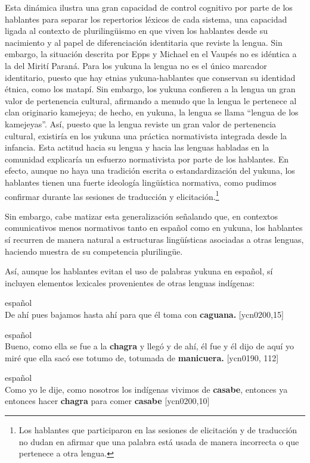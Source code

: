 \documentclass[output=paper]{langscibook}
\begin{document}
Esta dinámica ilustra una gran capacidad de control cognitivo por parte de los hablantes para separar los repertorios léxicos de cada sistema, una capacidad ligada al contexto de plurilingüismo en que viven los hablantes desde su nacimiento y al papel de diferenciación identitaria que reviste la lengua.  Sin embargo, la situación descrita por Epps y Michael en el Vaupés no es idéntica a la del Mirití Paraná. Para los yukuna la lengua no es el único marcador identitario, puesto que hay etnias yukuna-hablantes que conservan su identidad étnica, como los matapí.  Sin embargo, los yukuna confieren a la lengua un gran valor de pertenencia cultural, afirmando a menudo que la lengua le pertenece al clan originario kamejeya; de hecho, en yukuna, la lengua se llama “lengua de los kamejeyas”. Así, puesto que la lengua reviste un gran valor de pertenencia cultural, existiría en los yukuna una práctica normativista integrada desde la infancia. Esta actitud hacia su lengua y hacia las lenguas habladas en la comunidad explicaría un esfuerzo normativista por parte de los hablantes. En efecto, aunque no haya una tradición escrita o estandardización del yukuna, los hablantes tienen una fuerte ideología lingüística normativa, como pudimos confirmar durante las sesiones de traducción y elicitación.\footnote{Los hablantes que participaron en las sesiones de elicitación y de traducción no dudan en afirmar que una palabra está usada de manera incorrecta o que pertenece a otra lengua.}

Sin embargo, cabe matizar esta generalización señalando que, en contextos comunicativos menos normativos tanto en español como en yukuna, los hablantes sí recurren de manera natural a estructuras lingüísticas asociadas a otras lenguas, haciendo muestra de su competencia plurilingüe. 

Así, aunque los hablantes evitan el uso de palabras yukuna en español, sí incluyen elementos lexicales provenientes de otras lenguas indígenas: 

\ea
{español}\\
De ahí pues bajamos hasta ahí para que él toma con \textbf{caguana.} [ycn0200,15]
\z

\ea
{español}\\
Bueno, como ella se fue a la \textbf{chagra} y llegó y de ahí, él fue y él dijo de aquí yo miré que ella sacó ese totumo de, totumada de \textbf{manicuera.} {[ycn0190, 112]}
\z

\ea
{español}\\
 Como yo le dije, como nosotros los indígenas vivimos de \textbf{casabe}, entonces ya entonces hacer \textbf{chagra} para comer \textbf{casabe} [ycn0200,10]
\z
\end{document}
